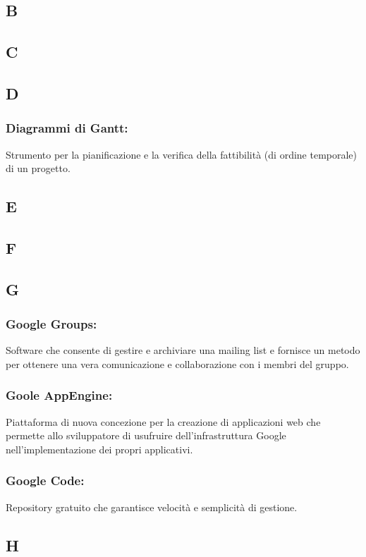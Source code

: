 \subsection*{B}
\subsection*{C}
\subsection*{D}
\subsubsection*{Diagrammi di Gantt:} Strumento per la pianificazione e la
verifica della fattibilit\`a (di ordine temporale) di un progetto.
\subsection*{E}
\subsection*{F}
\subsection*{G}
\subsubsection*{Google Groups:} Software che consente di gestire e archiviare
una mailing list e fornisce un metodo per ottenere una vera comunicazione e collaborazione con i membri del gruppo.

\subsubsection*{Goole AppEngine:} Piattaforma di nuova concezione per
la creazione di applicazioni web che permette allo sviluppatore di usufruire dell'infrastruttura
Google nell'implementazione dei propri applicativi.

\subsubsection*{Google Code:} Repository gratuito che garantisce
velocit\`a e semplicit\`a di gestione.

\subsection*{H}
